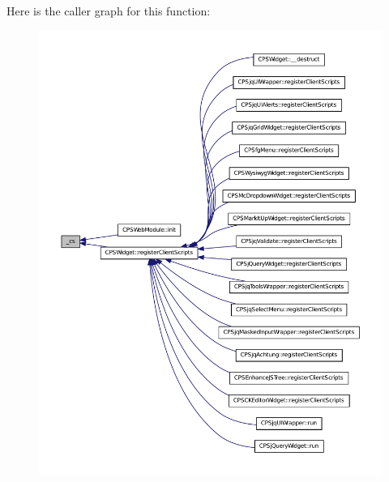 Here is the caller graph for this function:\nopagebreak
\begin{figure}[H]
\begin{center}
\leavevmode
\includegraphics[width=400pt]{classCPSHelperBase_af1b9a8d121721a5a4454e0fb067f7cad_icgraph}
\end{center}
\end{figure}



